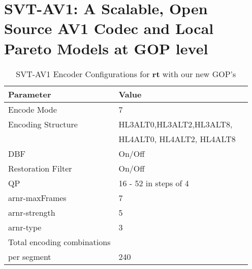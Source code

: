 \documentclass{book}
\begin{document}
	

	
	\chapter[SVT-AV1: A Scalable, Open Source AV1 Codec and Pareto Models]{SVT-AV1: A Scalable, Open Source AV1 Codec and Local Pareto Models at GOP level}
\begin{table}[ht!]
	\centering
	\begin{tabular}{l|ll} 
		\hline
		\textbf{Parameter} & \textbf{Value}  \\
		\hline\hline
		Encode Mode             &7 	      \\
		Encoding Structure   &HL3ALT0,HL3ALT2,HL3ALT8,\\ 
							&HL4ALT0, HL4ALT2, HL4ALT8  \\
		DBF                       & On/Off  					\\
		Restoration Filter        & On/Off  					\\
		QP                       &16 - 52 in steps of 4 \\   
		arnr-maxFrames         &7 \\
		arnr-strength          &5  \\
		arnr-type              &3 \\
		\hline
		Total encoding combinations \\
		per segment				   & 240       \\
		\hline
	\end{tabular}
	\caption{SVT-AV1 Encoder Configurations for \textbf{rt} with our new GOP's}\label{table:SVTAV1EncConf}
\end{table}
\end{document}
